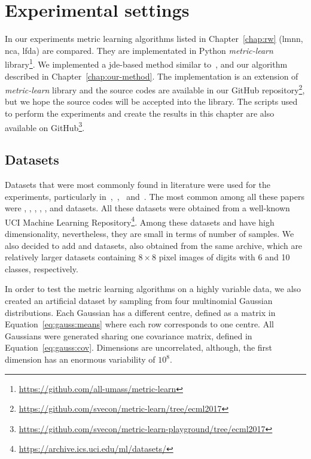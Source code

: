 \section{Experimental settings} 
In our experiments metric learning algorithms listed in Chapter~\ref{chap:rw} (\ac{lmnn}, \ac{nca}, \ac{lfda}) are compared. They are implementated in Python \textit{metric-learn} library\footnote{\url{https://github.com/all-umass/metric-learn}}. We implemented a \ac{jde}-based method similar to~\citep{fukui2013evolutionary}, and our algorithm described in Chapter~\ref{chap:our-method}. The implementation is an extension of \textit{metric-learn} library and the source codes are available in our GitHub repository\footnote{\url{https://github.com/svecon/metric-learn/tree/ecml2017}}, but we hope the source codes will be accepted into the library. The scripts used to perform the experiments and create the results in this chapter are also available on GitHub\footnote{\url{https://github.com/svecon/metric-learn-playground/tree/ecml2017}}.

\subsection{Datasets} \label{chap:exp:datasets}
Datasets that were most commonly found in literature were used for the experiments, particularly in~\citep{xing2002distance},~\citep{weinberger2009distance},~\citep{jacobgoldberger2004neighbourhood} and~\citep{fukui2013evolutionary}. The most common among all these papers were , , , , ,  and  datasets. All these datasets were obtained from a well-known UCI Machine Learning Repository\footnote{\url{https://archive.ics.uci.edu/ml/datasets/}}. Among these datasets  and  have high dimensionality, nevertheless, they are small in terms of number of samples. We also decided to add  and  datasets, also obtained from the same archive, which are relatively larger datasets containing $8\times 8$ pixel images of digits with 6 and 10 classes, respectively.

In order to test the metric learning algorithms on a highly variable data, we also created an artificial dataset  by sampling from four multinomial Gaussian distributions. Each Gaussian has a different centre, defined as a matrix in Equation~\ref{eq:gauss:means} where each row corresponds to one centre. All Gaussians were generated sharing one covariance matrix, defined in Equation~\ref{eq:gauss:cov}. Dimensions are uncorrelated, although, the first dimension has an enormous variability of $10^8$.

